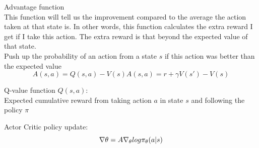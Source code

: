 
Advantage function\\

This function will tell us the improvement compared to the average the action taken at that state is. In other words, this function calculates the extra reward I get if I take this action. The extra reward is that beyond the expected value of that state.\\
		Push up the probability of an action from a state $s$ if this action was better than the expected value
		\begin{equation}
		A(s, a) = Q(s, a) - V(s)		
		A(s, a) = r + \gamma V(s') - V(s) 
		\end{equation}
		

Q-value function $Q(s, a)$:\\ %
		Expected cumulative reward from taking action $a$ in state $s$ and following the policy $\pi$

Actor Critic policy update:
	\begin{equation}
		\mathnormal{
		\nabla \theta = A \nabla_\theta log \pi_\theta (a | s)}
	\end{equation}
